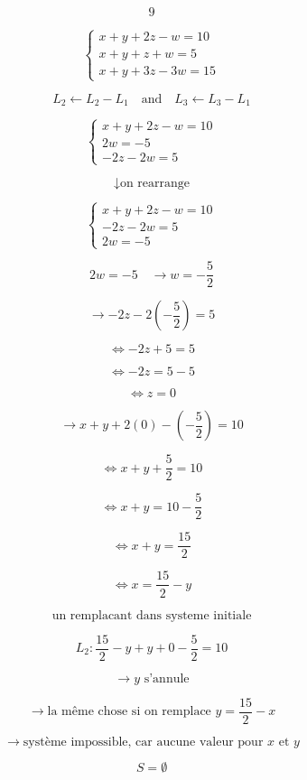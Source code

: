 \documentclass{article}
\begin{document}
\[
\text{9}
\]

\[
\begin{cases}
x + y + 2z - w = 10 \\
x + y + z + w = 5 \\
x + y + 3z - 3w = 15
\end{cases}
\]

\[
L_2 \leftarrow L_2 - L_1 \quad \text{and} \quad L_3 \leftarrow L_3 - L_1
\]

\[
\begin{cases}
x + y + 2z - w = 10 \\
2w = -5 \\
-2z - 2w = 5
\end{cases}
\]

\[
\downarrow \text{on rearrange}
\]

\[
\begin{cases}
x + y + 2z - w = 10 \\
-2z - 2w = 5 \\
2w = -5
\end{cases}
\]

\[
2w = -5 \quad \rightarrow w = -\frac{5}{2}
\]

\[
\rightarrow -2z - 2(-\frac{5}{2}) = 5
\]

\[
\Leftrightarrow -2z + 5 = 5
\]

\[
\Leftrightarrow -2z = 5 - 5
\]

\[
\Leftrightarrow z = 0
\]

\[
\rightarrow x + y + 2(0) - (-\frac{5}{2}) = 10
\]

\[
\Leftrightarrow x + y + \frac{5}{2} = 10
\]

\[
\Leftrightarrow x + y = 10 - \frac{5}{2}
\]

\[
\Leftrightarrow x + y = \frac{15}{2}
\]

\[
\Leftrightarrow x = \frac{15}{2} - y
\]

\[
\text{un remplacant dans systeme initiale}
\]

\[
L_2: \frac{15}{2} - y + y + 0 - \frac{5}{2} = 10
\]

\[
\rightarrow y \text{ s'annule}
\]

\[
\rightarrow \text{la même chose si on remplace } y = \frac{15}{2} - x
\]

\[
\rightarrow \text{système impossible, car aucune valeur pour } x \text{ et } y
\]

\[
S = \emptyset
\]
\end{document}
